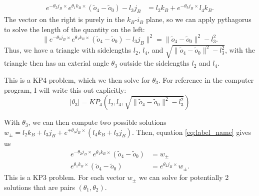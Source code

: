 \documentclass[11pt]{article}
\begin{document}
\begin{align*}
e^{-\theta_2 j_B \times}e^{\theta_1 k_B \times} (\tilde{o}_{4} - \tilde{o}_0) - l_3 j_B &= l_2 k_B + e^{- \theta_3 j_B \times } l_4 k_B
.\end{align*}
The vector on the right is purely in the $k_B$-$i_B$ plane, so we can apply pythagorus to solve the length of the quantity on the left:
\[
\|e^{-\theta_2 j_B \times}e^{\theta_1 k_B \times} (\tilde{o}_{4} - \tilde{o}_0) - l_3 j_B \|^2 = \|\tilde{o}_4 - \tilde{o}_0\|^2 - l_3^2
.\] 
Thus, we have a triangle with sidelengths $l_2$, $l_4$, and $\sqrt{\|\tilde{o}_4 - \tilde{o}_0\|^2 - l_3^2}$, with the triangle then has an exterial angle $\theta_3$ outside the sidelengths $l_2$ and $l_4$.

\begin{center}


\end{center}

This is a KP4 problem, which we then solve for $\theta_3$.
For reference in the computer program, I will write this out explicitly:
\begin{equation}
    |\theta_3| = KP_4(l_2, l_4, \sqrt{\|\tilde{o}_4 - \tilde{o}_0\|^2 - l_3^2}
)
\end{equation}


With $\theta_3$, we can then compute two possible solutions $w_{\pm} = l_2 k_B + l_3j_B + e^{\mp \theta_3 j_B \times } (l_4 k_B + l_3 j_B)$.
Then, equation \eqref{eq:label_name} gives us
\begin{align*}
    e^{-\theta_2 j_B \times}e^{\theta_1 k_B \times} (\tilde{o}_{4} - \tilde{o}_0) &= w_{\pm}\\
   e^{\theta_1 k_B \times} (\tilde{o}_{4} - \tilde{o}_0) &= e^{\theta_2 j_B \times }w_{\pm}
.\end{align*}
This is a KP3 problem.
For each vector $w_{\pm}$ we can solve for potentially 2 solutions that are pairs $(\theta_1, \theta_2)$.
\end{document}
